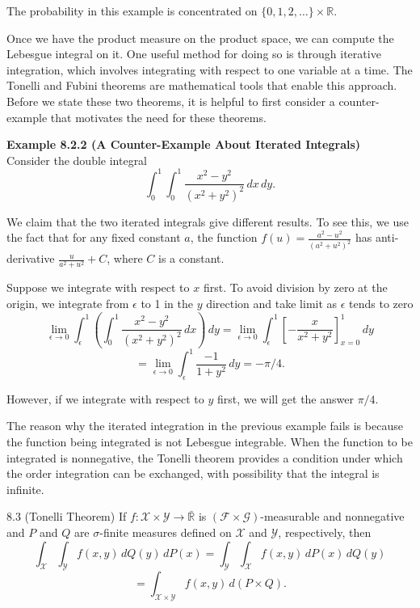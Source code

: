 The probability in this example is concentrated on $\{0,1,2,\dots\}\times \mathbb{R}$.

Once we have the product measure on the product space, we can compute the Lebesgue integral on it. One useful method for doing so is through iterative integration, which involves integrating with respect to one variable at a time. The Tonelli and Fubini theorems are mathematical tools that enable this approach. Before we state these two theorems, it is helpful to first consider a counter-example that motivates the need for these theorems.

\textbf{Example 8.2.2 (A Counter-Example About Iterated Integrals)} \\
Consider the double integral
\[
\int_0^1\int_0^1 \frac{x^2-y^2}{(x^2+y^2)^2}\, dx\, dy.
\]

We claim that the two iterated integrals give different results. To see this, we use the fact that for any fixed constant $a$, the function $f(u)=\frac{a^2-u^2}{(a^2+u^2)^2}$ has anti-derivative $\frac{u}{a^2+u^2}+C$, where $C$ is a constant.

Suppose we integrate with respect to $x$ first. To avoid division by zero at the origin, we integrate from $\epsilon$ to 1 in the $y$ direction and take limit as $\epsilon$ tends to zero
\[
\lim_{\epsilon\to 0}\int_{\epsilon}^1 \left(\int_0^1 \frac{x^2-y^2}{(x^2+y^2)^2}\, dx\right)\, dy
=
\lim_{\epsilon\to 0}\int_{\epsilon}^1 \left[-\frac{x}{x^2+y^2}\right]_{x=0}^1\, dy
\]
\[
=
\lim_{\epsilon\to 0}\int_{\epsilon}^1 \frac{-1}{1+y^2}\, dy
=
-\pi/4.
\]

However, if we integrate with respect to $y$ first, we will get the answer $\pi/4$.

The reason why the iterated integration in the previous example fails is because the function being integrated is not Lebesgue integrable. When the function to be integrated is nonnegative, the Tonelli theorem provides a condition under which the order integration can be exchanged, with possibility that the integral is infinite.

\begin{thmbox}{8.3 (Tonelli Theorem)}
If $f:\mathcal{X}\times \mathcal{Y}\to \bar{\mathbb{R}}$ is $(\mathcal{F}\times \mathcal{G})$-measurable and nonnegative and $P$ and $Q$ are $\sigma$-finite measures defined on $\mathcal{X}$ and $\mathcal{Y}$, respectively, then
\[
\int_{\mathcal{X}} \int_{\mathcal{Y}} f(x,y)\, dQ(y)\, dP(x)
=
\int_{\mathcal{Y}} \int_{\mathcal{X}} f(x,y)\, dP(x)\, dQ(y)
\]
\[
=
\int_{\mathcal{X}\times \mathcal{Y}} f(x,y)\, d(P\times Q).
\]
\end{thmbox}

